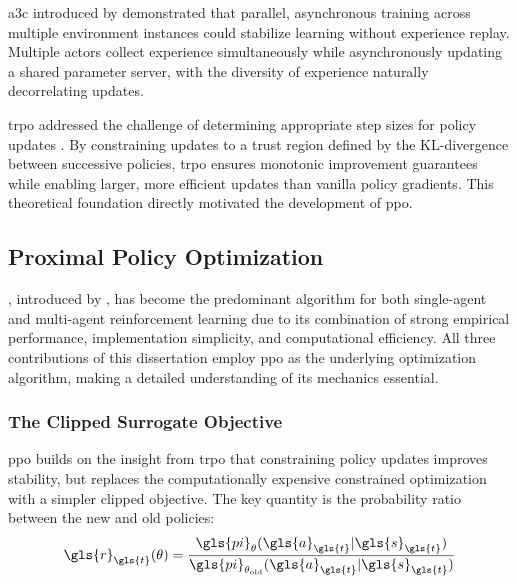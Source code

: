 \Gls{a3c} introduced by \cite{mnih2016} demonstrated that parallel, 
asynchronous training across multiple environment instances could 
stabilize learning without experience replay. Multiple actors collect experience 
simultaneously while asynchronously updating a shared parameter server, 
with the diversity of experience naturally decorrelating updates.

\Gls{trpo} addressed the challenge of determining appropriate step sizes 
for policy updates \cite{schulman2017}. By constraining updates to a 
trust region defined by the KL-divergence between successive policies, 
\gls{trpo} ensures monotonic improvement guarantees while enabling larger, 
more efficient updates than vanilla policy gradients. This theoretical 
foundation directly motivated the development of \gls{ppo}.

\subsection{Proximal Policy Optimization}
\label{sec:ppo}

, introduced by \cite{schulman2017a}, 
has become the predominant algorithm for both single-agent and multi-agent 
reinforcement learning due to its combination of strong empirical performance, 
implementation simplicity, and computational efficiency. 
All three contributions of this dissertation employ \gls{ppo} as the underlying 
optimization algorithm, making a detailed understanding of its mechanics essential.

\subsubsection{The Clipped Surrogate Objective}

\Gls{ppo} builds on the insight from \gls{trpo} that constraining 
policy updates improves stability, but replaces the computationally 
expensive constrained optimization with a simpler clipped objective. 
The key quantity is the probability ratio between the new and old policies:
\begin{equation}
    \gls{r}_{\gls{t}}(\theta) = \frac{\gls{pi}_\theta(\gls{a}_{\gls{t}} 
    | \gls{s}_{\gls{t}})}{\gls{pi}_{\theta_{\text{old}}}(\gls{a}_{\gls{t}} | \gls{s}_{\gls{t}})}
\end{equation}

